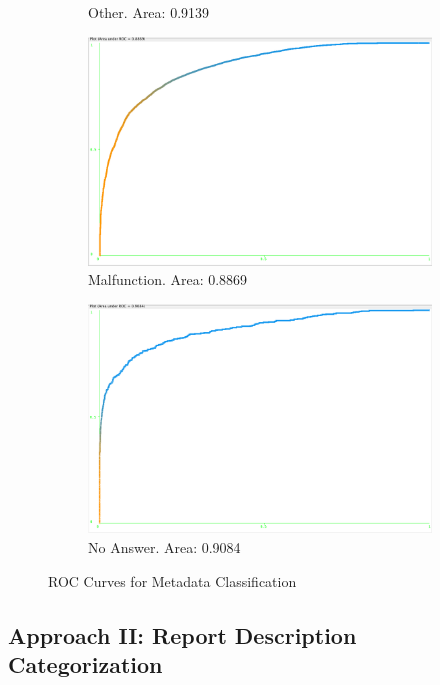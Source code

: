 \documentclass[11pt, notitlepage,abstracton,oneside]{article}   	%
\begin{document}
\begin{figure}[H]
\begin{subfigure}[b]{0.3\textwidth}
        \caption{Other. Area: 0.9139}
        \label{fig:other}
    \end{subfigure}    
    \begin{subfigure}[b]{0.4\textwidth}
        \centering
        \includegraphics[width=\textwidth]{figures/malfunction}
        \caption{Malfunction. Area: 0.8869}
        \label{fig:injury}
    \end{subfigure} 
    \begin{subfigure}[b]{0.4\textwidth}
        \centering
        \includegraphics[width=\textwidth]{figures/no-answer}
        \caption{No Answer. Area: 0.9084}
        \label{fig:no-figure}
    \end{subfigure}          
    \caption{ROC Curves for Metadata Classification}
    \label{fig:ROC Curves}
\end{figure}

\subsection{Approach II: Report Description Categorization}
\end{document}
